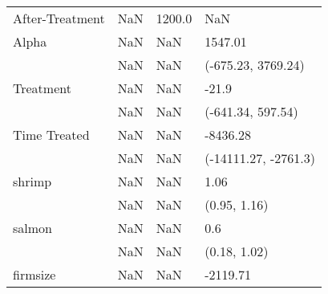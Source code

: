 \begin{tabular}{llll}
After-Treatment &                     NaN &                 1200.0 &                   NaN \\
Alpha           &                     NaN &                    NaN &               1547.01 \\
                &                     NaN &                    NaN &    (-675.23, 3769.24) \\
Treatment       &                     NaN &                    NaN &                 -21.9 \\
                &                     NaN &                    NaN &     (-641.34, 597.54) \\
Time Treated    &                     NaN &                    NaN &              -8436.28 \\
                &                     NaN &                    NaN &  (-14111.27, -2761.3) \\
shrimp          &                     NaN &                    NaN &                  1.06 \\
                &                     NaN &                    NaN &          (0.95, 1.16) \\
salmon          &                     NaN &                    NaN &                   0.6 \\
                &                     NaN &                    NaN &          (0.18, 1.02) \\
firmsize        &                     NaN &                    NaN &              -2119.71 \\
 
\bottomrule
\end{tabular}
